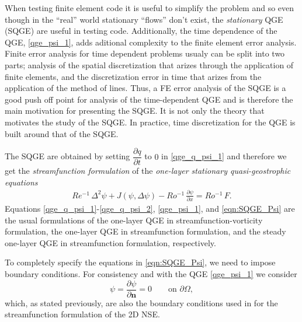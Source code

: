 When testing finite element code it is useful to simplify the problem and so
even though in the ``real'' world stationary ``flows'' don't exist, the
\emph{stationary} QGE (SQGE) are useful in testing code.  Additionally, the time
dependence of the QGE, \eqref{qge_psi_1}, adds aditional complexity to the
finite element error analysis. Finite error analysis for time dependent problems
usualy can be split into two parts; analysis of the spatial discretization that
arizes through the application of finite elements, and the discretization error
in time that arizes from the application of the method of lines. Thus, a FE
error analysis of the SQGE is a good push off point for analysis of the
time-dependent QGE and is therefore the main motivation for presenting the SQGE.
It is not only the theory that motivates the study of the SQGE. In practice,
time discretization for the QGE is built around that of the SQGE.

The SQGE are obtained by setting $\dfrac{\partial q}{\partial t}$ to $0$ in
\eqref{qge_q_psi_1} and therefore we get the \emph{streamfunction formulation}
of the \emph{one-layer stationary quasi-geostrophic equations}
\begin{eqnarray}
  Re^{-1} \, \Delta^2 \psi + J(\psi , \Delta \psi) - Ro^{-1} \, \frac{\partial
    \psi}{\partial x} = Ro^{-1} \, F .
  \label{eqn:SQGE_Psi}
\end{eqnarray}
Equations \eqref{qge_q_psi_1}-\eqref{qge_q_psi_2}, \eqref{qge_psi_1}, and
\eqref{eqn:SQGE_Psi} are the usual formulations of the one-layer QGE in
streamfunction-vorticity formulation, the one-layer QGE in streamfunction
formulation, and the steady one-layer QGE in streamfunction formulation,
respectively.

To completely specify the equations in \eqref{eqn:SQGE_Psi}, we need to impose
boundary conditions. For consistency and with the QGE \eqref{qge_psi_1}  we
consider
\begin{equation*}
  \psi = \frac{\partial \psi}{\partial \mathbf{n}} = 0 \qquad \text{on } \partial \Omega,
\end{equation*}
which, as stated previously, are also the boundary conditions used in
\cite{Gunzburger89} for the streamfunction formulation of the 2D NSE.

